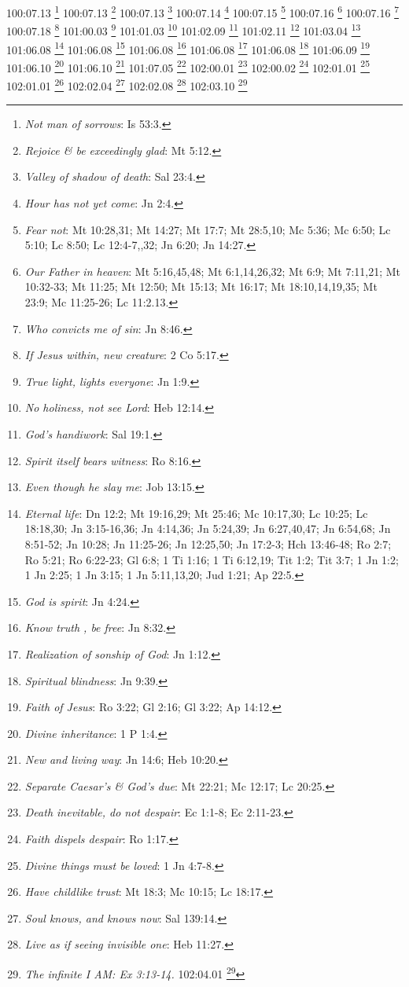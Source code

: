 {{{{{{{{100:07.13 \footnote{\textit{Not man of sorrows}: Is 53:3.}
100:07.13 \footnote{\textit{Rejoice & be exceedingly glad}: Mt 5:12.}
100:07.13 \footnote{\textit{Valley of shadow of death}: Sal 23:4.}
100:07.14 \footnote{\textit{Hour has not yet come}: Jn 2:4.}
100:07.15 \footnote{\textit{Fear not}: Mt 10:28,31; Mt 14:27; Mt 17:7; Mt 28:5,10; Mc 5:36; Mc 6:50; Lc 5:10; Lc 8:50; Lc 12:4-7,,32; Jn 6:20; Jn 14:27.}
100:07.16 \footnote{\textit{Our Father in heaven}: Mt 5:16,45,48; Mt 6:1,14,26,32; Mt 6:9; Mt 7:11,21; Mt 10:32-33; Mt 11:25; Mt 12:50; Mt 15:13; Mt 16:17; Mt 18:10,14,19,35; Mt 23:9; Mc 11:25-26; Lc 11:2.13.}
100:07.16 \footnote{\textit{Who convicts me of sin}: Jn 8:46.}
100:07.18 \footnote{\textit{If Jesus within, new creature}: 2 Co 5:17.}
101:00.03 \footnote{\textit{True light, lights everyone}: Jn 1:9.}
101:01.03 \footnote{\textit{No holiness, not see Lord}: Heb 12:14.}
101:02.09 \footnote{\textit{God's handiwork}: Sal 19:1.}
101:02.11 \footnote{\textit{Spirit itself bears witness}: Ro 8:16.}
101:03.04 \footnote{\textit{Even though he slay me}: Job 13:15.}
101:06.08 \footnote{\textit{Eternal life}: Dn 12:2; Mt 19:16,29; Mt 25:46; Mc 10:17,30; Lc 10:25; Lc 18:18,30; Jn 3:15-16,36; Jn 4:14,36; Jn 5:24,39; Jn 6:27,40,47; Jn 6:54,68; Jn 8:51-52; Jn 10:28; Jn 11:25-26; Jn 12:25,50; Jn 17:2-3; Hch 13:46-48; Ro 2:7; Ro 5:21; Ro 6:22-23; Gl 6:8; 1 Ti 1:16; 1 Ti 6:12,19; Tit 1:2; Tit 3:7; 1 Jn 1:2; 1 Jn 2:25; 1 Jn 3:15; 1 Jn 5:11,13,20; Jud 1:21; Ap 22:5.}
101:06.08 \footnote{\textit{God is spirit}: Jn 4:24.}
101:06.08 \footnote{\textit{Know truth , be free}: Jn 8:32.}
101:06.08 \footnote{\textit{Realization of sonship of God}: Jn 1:12.}
101:06.08 \footnote{\textit{Spiritual blindness}: Jn 9:39.}
101:06.09 \footnote{\textit{Faith of Jesus}: Ro 3:22; Gl 2:16; Gl 3:22; Ap 14:12.}
101:06.10 \footnote{\textit{Divine inheritance}: 1 P 1:4.}
101:06.10 \footnote{\textit{New and living way}: Jn 14:6; Heb 10:20.}
101:07.05 \footnote{\textit{Separate Caesar's & God's due}: Mt 22:21; Mc 12:17; Lc 20:25.}
102:00.01 \footnote{\textit{Death inevitable, do not despair}: Ec 1:1-8; Ec 2:11-23.}
102:00.02 \footnote{\textit{Faith dispels despair}: Ro 1:17.}
102:01.01 \footnote{\textit{Divine things must be loved}: 1 Jn 4:7-8.}
102:01.01 \footnote{\textit{Have childlike trust}: Mt 18:3; Mc 10:15; Lc 18:17.}
102:02.04 \footnote{\textit{Soul knows, and knows now}: Sal 139:14.}
102:02.08 \footnote{\textit{Live as if seeing invisible one}: Heb 11:27.}
102:03.10 \footnote{\textit{The infinite I AM: Ex 3:13-14.}
102:04.01 \footnote{\textit{Let mind of Christ be in you}: 1 Co 2:16; Flp 2:5.}
}}}}}}}}}

